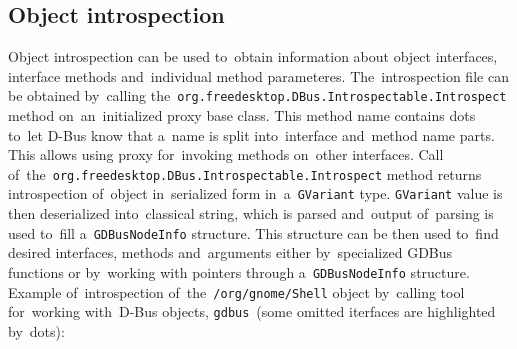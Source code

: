 \subsection{Object introspection}
Object introspection can be used to~obtain information about object interfaces,
interface methods and~individual method parameteres. The~introspection file can
be obtained by~calling the~\texttt{org.freedesktop.DBus.Introspectable.Introspect} method on~an~initialized proxy base class. This method name contains dots to~let
D-Bus know that a~name is split into~interface and~method name parts. This allows
using proxy for~invoking methods on~other interfaces.
Call of~the~\texttt{org.freedesktop.DBus.Introspectable.Introspect} method returns
introspection of~object in~serialized form in~a~\texttt{GVariant} type.
\texttt{GVariant} value is then deserialized into~classical string, which is
parsed and~output of~parsing is used to~fill a~\texttt{GDBusNodeInfo} structure.
This structure can be then used to~find desired interfaces, methods and~arguments
either by~specialized GDBus functions or by~working with pointers through
a~\texttt{GDBusNodeInfo} structure. Example of~introspection
of~the~\texttt{/org/gnome/Shell} object by~calling tool for~working with~D-Bus
objects, \texttt{gdbus}~(some omitted iterfaces are highlighted by~dots):
